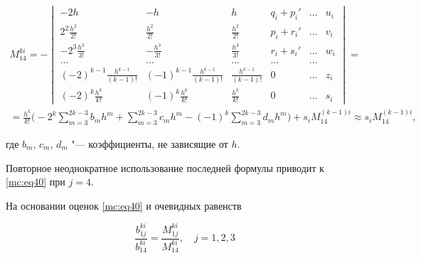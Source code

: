 \begin{multline}

\label{mc:eq42}

M_{14}^{ki}=-

\begin{vmatrix}

      -2h & -h & h  & q_i+p_i'  & \dots  & u_i

   \\

      2^2\frac{h^2}{2!} &   \frac{h^2}{2!} &   \frac{h^2}{2!}  & p_i+r_i'& \dots  & v_i

   \\

      -2^3\frac{h^3}{3!} &    -\frac{h^3}{3!} &   \frac{h^3}{3!}  & r_i+s_i'& \dots  & w_i

    \\

     \dots & \dots  & \dots  & \dots & \dots

   \\

     (-2)^{k-1}\frac{h^{k-1}}{\left(k-1\right)!} &   (-1)^{k-1}\frac{h^{k-1}}{\left(k-1\right)!}  &   \frac{h^{k-1}}{\left(k-1\right)!}  & 0  & \dots &  z_i

   \\

     (-2)^{k}\frac{h^{k}}{k!} &   (-1)^{k}\frac{h^{k}}{k!}  &   \frac{h^{k}}{k!} & 0 &  \dots &  s_i

 \end{vmatrix}

 =

 \\

   =\frac{h^{k}}{k!} \biggl(-2^k\sum_{m=3}^{2k-3}b_mh^m{+}\sum_{m=3}^{2k-3}c_mh^m - (-1)^{k}\sum_{m=3}^{2k-3}d_mh^m\biggr) + s_iM_{14}^{(k-1)i}\approx s_iM_{14}^{(k-1)i},

\end{multline}

где $b_m$, $c_m$, $d_m$ "--- коэффициенты, не зависящие от $h$. 

Повторное неоднократное использование  последней формулы приводит к \eqref{mc:eq40} при $j=4$.



На основании оценок \eqref{mc:eq40} и очевидных равенств

\begin{equation}

   \frac{b_{1j}^{ki}}{b_{14}^{ki}}=\frac{M_{1j}^{ki}}{M_{14}^{ki}},\quad j=1,  2,  3

\end{equation}

